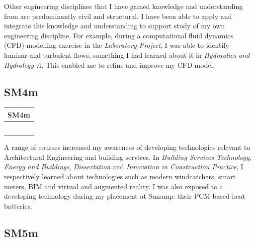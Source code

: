Other engineering disciplines that I have gained knowledge and understanding from are predominantly civil and structural.
I have been able to apply and integrate this knowledge and understanding to support study of my own engineering discipline.
For example, during a computational fluid dynamics (CFD) modelling exercise in the \textit{Laboratory Project}, I was able to identify laminar and turbulent flows, something I had learned about it in \textit{Hydraulics and Hydrology A}.
This enabled me to refine and improve my CFD model.








\subsection*{SM4m}

\begin{table}
	\begin{tabular}{|ll|}
		\hline
		\multicolumn{2}{|c|}{\cellcolor[HTML]{F8A102}\textbf{SM4m \master}} \\ \hline
		\BST & \DPA \\
		\CAS & \DSA \\
		\EnBldgs & \PRJ \\
		\DST & \ICP \\
		\WSD &  \\ \hline
	\end{tabular}
\end{table}

A range of courses increased my awareness of developing technologies relevant to Architectural Engineering and building services.
In \textit{Building Services Technology}, \textit{Energy and Buildings}, \textit{Dissertation} and \textit{Innovation in Construction Practice}, I respectively learned about technologies such as modern windcatchers, smart meters, BIM and virtual and augmented reality.
I was also exposed to a developing technology during my placement at Sunamp: their PCM-based heat batteries.








\subsection*{SM5m}

